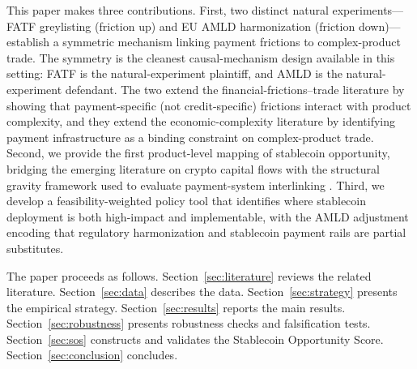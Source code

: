 This paper makes three contributions. First, two distinct natural experiments---FATF greylisting (friction up) and EU AMLD harmonization (friction down)---establish a symmetric mechanism linking payment frictions to complex-product trade. The symmetry is the cleanest causal-mechanism design available in this setting: FATF is the natural-experiment plaintiff, and AMLD is the natural-experiment defendant. The two extend the financial-frictions--trade literature \citep{Manova2013_credit_constraints} by showing that payment-specific (not credit-specific) frictions interact with product complexity, and they extend the economic-complexity literature \citep{Hidalgo2009_building_blocks, Hausmann2014_atlas} by identifying payment infrastructure as a binding constraint on complex-product trade. Second, we provide the first product-level mapping of stablecoin opportunity, bridging the emerging literature on crypto capital flows \citep{GrafvonLuckner2023_capital_flows, Auer2025_defiying_gravity} with the structural gravity framework used to evaluate payment-system interlinking \citep{FerrarMinesso2026_payment_links}. Third, we develop a feasibility-weighted policy tool that identifies where stablecoin deployment is both high-impact and implementable, with the AMLD adjustment encoding that regulatory harmonization and stablecoin payment rails are partial substitutes.

The paper proceeds as follows. Section~\ref{sec:literature} reviews the related literature. Section~\ref{sec:data} describes the data. Section~\ref{sec:strategy} presents the empirical strategy. Section~\ref{sec:results} reports the main results. Section~\ref{sec:robustness} presents robustness checks and falsification tests. Section~\ref{sec:sos} constructs and validates the Stablecoin Opportunity Score. Section~\ref{sec:conclusion} concludes.
